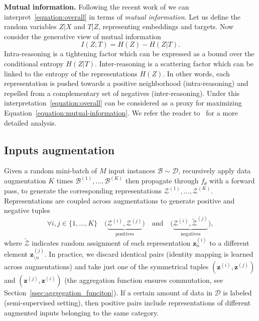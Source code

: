 \documentclass{article}
\begin{document}
\textbf{Mutual information.} Following the recent work of \cite{boudiaf2020metric} we can interpret~\eqref{equation:overall} in terms of \emph{mutual information}. Let us define the random variables $Z|X$ and $T|Z$, representing embeddings and targets. Now consider the generative view of mutual information 
\begin{equation}\label{equation:mutual-information}
I(Z; T) = H(Z) - H(Z|T).
\end{equation}
Intra-reasoning is a tightening factor which can be expressed as a bound over the conditional entropy $H(Z|T)$. Inter-reasoning is a scattering factor which can be linked to the entropy of the representations $H(Z)$. In other words, each representation is pushed towards a positive neighborhood (intra-reasoning) and repelled from a complementary set of negatives (inter-reasoning).
Under this interpretation~\eqref{equation:overall} can be considered as a proxy for maximizing Equation~\eqref{equation:mutual-information}. We refer the reader to~\cite{boudiaf2020metric} for a more detailed analysis.


\subsection{Inputs augmentation}\label{ssec:inputs_augmentation}

Given a random mini-batch of $M$ input instances $\mathcal{B} \sim \mathcal{D}$, recursively apply data augmentation $K$ times $\mathcal{B}^{(1)}, \dots, \mathcal{B}^{(K)}$ then propagate through $f_{\theta}$ with a forward pass, to generate the corresponding representations $\mathcal{Z}^{(1)}, \dots, \mathcal{Z}^{(K)}$.
Representations are coupled across augmentations to generate positive and negative tuples
\begin{equation}
 \forall i, j \in \{1, \dots, K\}
 \quad
 \big(\underbrace{ \mathcal{Z}^{(i)}, \mathcal{Z}^{(j)} }_{\text{positives}}\big)
 \quad
 \text{and}
 \quad
 \big(\underbrace{ \mathcal{Z}^{(i)}, \tilde{\mathcal{Z}}^{(j)} }_{\text{negatives}}\big),
\end{equation}
where $\tilde{\mathcal{Z}}$ indicates random assignment of each representation $\mathbf{z}^{(i)}_{n}$ to a different element $\mathbf{z}^{(j)}_{\setminus n}$. In practice, we discard identical pairs (identity mapping is learned across augmentations) and take just one of the symmetrical tuples $(\mathbf{z}^{(i)}, \mathbf{z}^{(j)})$ and $(\mathbf{z}^{(j)}, \mathbf{z}^{(i)})$ (the aggregation function ensures commutation, see Section~\ref{ssec:aggregation_funciton}).
If a certain amount of data in $\mathcal{D}$ is labeled (semi-supervised setting), then positive pairs include representations of different augmented inputs belonging to the same category.
\end{document}
